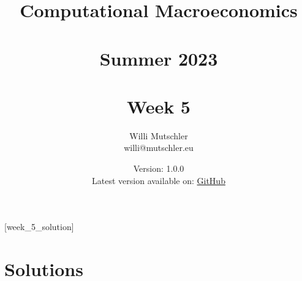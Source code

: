 
\newif\ifDisplaySolutions\DisplaySolutionstrue


\title{Computational Macroeconomics\\~\\Summer 2023\\~\\Week 5}
\author{Willi Mutschler\\willi@mutschler.eu}
\date{Version: 1.0.0\\Latest version available on: \href{https://github.com/wmutschl/Computational-Macroeconomics/releases/latest/download/week_5.pdf}{GitHub}}
\maketitle\thispagestyle{empty}

\newpage
{}[week_5_solution]
\tableofcontents\thispagestyle{empty}\newpage

\setcounter{page}{1}
\newpage
\newpage


\printbibliography
\newpage

\ifDisplaySolutions
\newpage
\appendix
\section{Solutions}

\fi
